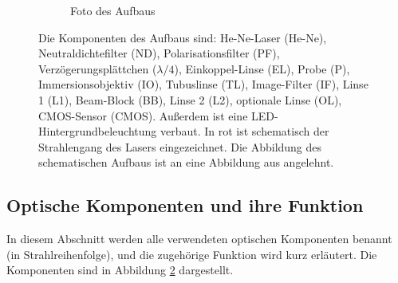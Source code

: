 \documentclass[a4paper, titlepage,  ngerman]{book}
\begin{document}
\begin{figure}
\begin{subfigure}{0.9\textwidth}
			\caption{Foto des Aufbaus}
			\label{fig:aufsicht_aufbau_anotated}
		\end{subfigure}
		\caption[Versuchsaufbau]{Die Komponenten des Aufbaus sind: He-Ne-Laser (He-Ne), Neutraldichtefilter (ND), Polarisationsfilter (PF), Verzögerungsplättchen ($\lambda/4$), Einkoppel-Linse (EL), Probe (P), Immersionsobjektiv (IO), Tubuslinse (TL), Image-Filter (IF), Linse 1 (L1), Beam-Block (BB), Linse 2 (L2), optionale Linse (OL), CMOS-Sensor (CMOS). Außerdem ist eine LED-Hintergrundbeleuchtung verbaut. In rot ist schematisch der Strahlengang des Lasers eingezeichnet. Die Abbildung des schematischen Aufbaus ist an eine Abbildung aus \cite{Jaruschewski.2020} angelehnt.}
		\label{fig:Aufbau}
	\end{figure}
	\subsection{Optische Komponenten und ihre Funktion}
		In diesem Abschnitt werden alle verwendeten optischen Komponenten benannt (in Strahlreihenfolge), und die zugehörige Funktion wird kurz erläutert. Die Komponenten sind in Abbildung \ref{fig:Aufbau} dargestellt.
\end{document}
